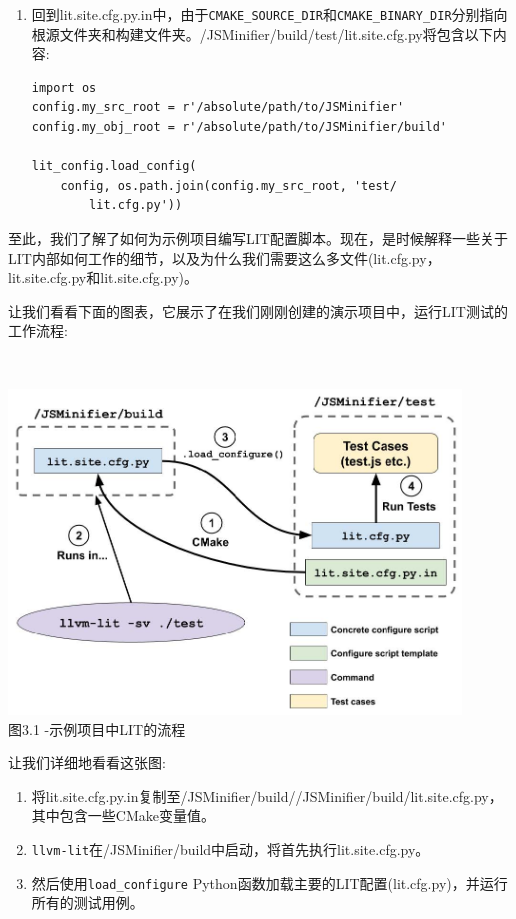 \begin{enumerate}
\item 回到lit.site.cfg.py.in中，由于\texttt{CMAKE\_SOURCE\_DIR}和\texttt{CMAKE\_BINARY\_DIR}分别指向根源文件夹和构建文件夹。/JSMinifier/build/test/lit.site.cfg.py将包含以下内容:

\begin{lstlisting}[style=stylePython]
import os
config.my_src_root = r'/absolute/path/to/JSMinifier'
config.my_obj_root = r'/absolute/path/to/JSMinifier/build'

lit_config.load_config(
	config, os.path.join(config.my_src_root, 'test/
		lit.cfg.py'))
\end{lstlisting}

\end{enumerate}

至此，我们了解了如何为示例项目编写LIT配置脚本。现在，是时候解释一些关于LIT内部如何工作的细节，以及为什么我们需要这么多文件(lit.cfg.py，lit.site.cfg.py和lit.site.cfg.py)。


让我们看看下面的图表，它展示了在我们刚刚创建的演示项目中，运行LIT测试的工作流程:

\hspace*{\fill} \\ %
\begin{center}
\includegraphics[width=0.9\textwidth]{content/1/chapter3/images/1.jpg}\\
图3.1 -示例项目中LIT的流程
\end{center}

让我们详细地看看这张图:

\begin{enumerate}
\item 将lit.site.cfg.py.in复制至/JSMinifier/build//JSMinifier/build/lit.site.cfg.py，其中包含一些CMake变量值。

\item \texttt{llvm-lit}在/JSMinifier/build中启动，将首先执行lit.site.cfg.py。

\item 然后使用\texttt{load\_configure} Python函数加载主要的LIT配置(lit.cfg.py)，并运行所有的测试用例。
\end{enumerate}

